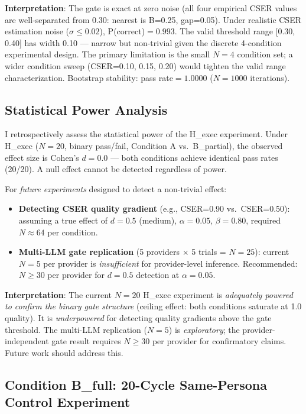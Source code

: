 \documentclass[12pt]{article}
\begin{document}
\textbf{Interpretation}: The gate is exact at zero noise (all four empirical CSER
values are well-separated from 0.30: nearest is B=0.25, gap=0.05). Under realistic
CSER estimation noise ($\sigma \leq 0.02$), P(correct)$=0.993$. The valid threshold
range [0.30, 0.40] has width 0.10 --- narrow but non-trivial given the discrete
4-condition experimental design. The primary limitation is the small $N=4$ condition
set; a wider condition sweep (CSER=0.10, 0.15, 0.20) would tighten the valid range
characterization. Bootstrap stability: pass rate$=1.0000$ ($N=1000$ iterations).

\subsection{Statistical Power Analysis}

I retrospectively assess the statistical power of the H\_exec experiment.
Under H\_exec ($N=20$, binary pass/fail, Condition A vs.\ B\_partial), the observed
effect size is Cohen's $d = 0.0$ --- both conditions achieve identical pass rates
(20/20). A null effect cannot be detected regardless of power.

For \emph{future experiments} designed to detect a non-trivial effect:
\begin{itemize}
  \item \textbf{Detecting CSER quality gradient} (e.g., CSER=0.90 vs.\ CSER=0.50): 
        assuming a true effect of $d = 0.5$ (medium), $\alpha = 0.05$, $\beta = 0.80$,
        required $N \approx 64$ per condition.
  \item \textbf{Multi-LLM gate replication} (5 providers $\times$ 5 trials = $N=25$):
        current $N=5$ per provider is \emph{insufficient} for provider-level inference.
        Recommended: $N \geq 30$ per provider for $d = 0.5$ detection at $\alpha = 0.05$.
\end{itemize}

\noindent\textbf{Interpretation}: The current $N=20$ H\_exec experiment is
\emph{adequately powered to confirm the binary gate structure} (ceiling effect: both
conditions saturate at 1.0 quality). It is \emph{underpowered} for detecting
quality gradients above the gate threshold. The multi-LLM replication ($N=5$)
is \emph{exploratory}; the provider-independent gate result requires $N \geq 30$
per provider for confirmatory claims. Future work should address this.

\subsection{Condition B\_full: 20-Cycle Same-Persona Control Experiment}
\label{sec:condition_b_full}
\end{document}
